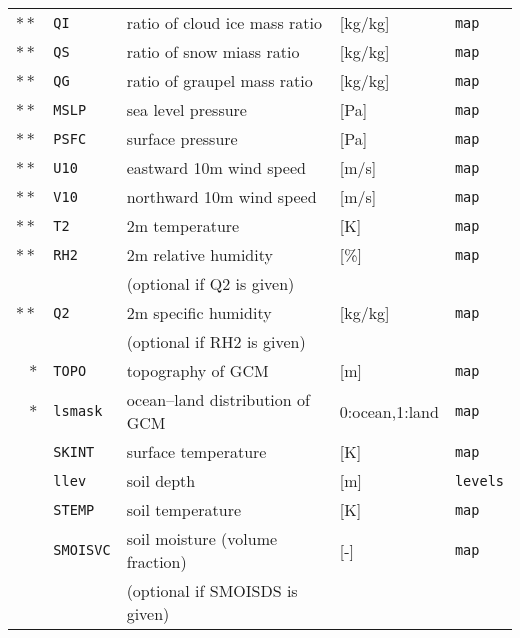 {\begin{table}[bth]
\begin{center}
\begin{tabularx}{150mm}{rl|l|l|l}
$\ast\ast$ &\verb|QI|      & ratio of cloud ice mass ratio    & [kg/kg]        & \verb|map|         \\
$\ast\ast$ &\verb|QS|      & ratio of snow miass ratio        & [kg/kg]        & \verb|map|         \\
$\ast\ast$ &\verb|QG|      & ratio of graupel mass ratio      & [kg/kg]        & \verb|map|         \\
$\ast\ast$ &\verb|MSLP|    & sea level pressure               & [Pa]           & \verb|map|         \\
$\ast\ast$ &\verb|PSFC|    & surface pressure                 & [Pa]           & \verb|map|         \\
$\ast\ast$ &\verb|U10|     & eastward 10m wind speed          & [m/s]          & \verb|map|         \\
$\ast\ast$ &\verb|V10|     & northward 10m wind speed         & [m/s]          & \verb|map|         \\
$\ast\ast$ &\verb|T2|      & 2m temperature                   & [K]            & \verb|map|         \\
$\ast\ast$ &\verb|RH2|     & 2m relative humidity             & [\%]           & \verb|map|         \\
           &               & (optional if Q2 is given)        &                &                    \\
$\ast\ast$ &\verb|Q2|      & 2m specific humidity             & [kg/kg]        & \verb|map|         \\
           &               & (optional if RH2 is given)       &                &                    \\
    $\ast$ &\verb|TOPO|    & topography of GCM                & [m]            & \verb|map|         \\
    $\ast$ &\verb|lsmask|  & ocean--land distribution of GCM  & 0:ocean,1:land & \verb|map|         \\
           &\verb|SKINT|   & surface temperature              & [K]            & \verb|map|         \\
           &\verb|llev|    & soil depth                       & [m]            & \verb|levels|      \\
           &\verb|STEMP|   & soil temperature                 & [K]            & \verb|map|         \\
           &\verb|SMOISVC| & soil moisture (volume fraction)  & [-]            & \verb|map|         \\
           &               & (optional if SMOISDS is given)   &                &                    \\

\end{tabularx}
\end{center}
\end{table}}
